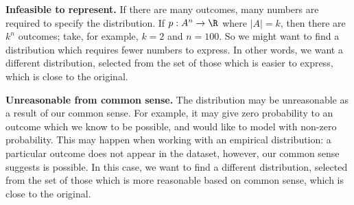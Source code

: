 

\textbf{Infeasible to represent.}
If there are many outcomes, many numbers are required to specify the distribution.
If $p: A^n \to \R$ where $|A| = k$, then there are $k^n$ outcomes; take, for example, $k = 2$ and $n = 100$.
So we might want to find a distribution which requires fewer numbers to express.
In other words, we want a different distribution, selected from the set of those which is easier to express, which is close to the original.

\textbf{Unreasonable from common sense.}
The distribution may be unreasonable as a result of our common sense.
For example, it may give zero probability to an outcome which we know to be possible, and would like to model with non-zero probability.
This may happen when working with an empirical distribution: a particular outcome does not appear in the dataset, however, our common sense suggests is possible.
In this case, we want to find a different distribution, selected from the set of those which is more reasonable based on common sense, which is close to the original.
\strats
